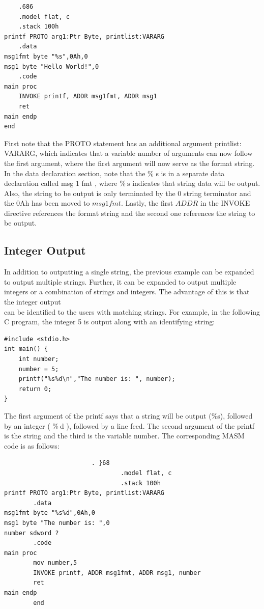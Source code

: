 \documentclass[10pt]{book}
\begin{document}
\begin{verbatim}
    .686
    .model flat, c
    .stack 100h
printf PROTO arg1:Ptr Byte, printlist:VARARG
    .data
msg1fmt byte "%s",0Ah,0
msg1 byte "Hello World!",0
    .code
main proc
    INVOKE printf, ADDR msg1fmt, ADDR msg1
    ret
main endp
end
\end{verbatim}

First note that the PROTO statement has an additional argument printlist: VARARG, which indicates that a variable number of arguments can now follow the first argument, where the first argument will now serve as the format string. In the data declaration section, note that the $\%$ s is in a separate data declaration called msg 1 fmt , where $\% \mathrm{~s}$ indicates that string data will be output. Also, the string to be output is only terminated by the 0 string terminator and the 0Ah has been moved to $m s g 1 f m t$. Lastly, the first $A D D R$ in the INVOKE directive references the format string and the second one references the string to be output.

\subsection{Integer Output}
In addition to outputting a single string, the previous example can be expanded to output multiple strings. Further, it can be expanded to output multiple integers or a combination of strings and integers. The advantage of this is that the integer output\\
can be identified to the users with matching strings. For example, in the following C program, the integer 5 is output along with an identifying string:


\begin{verbatim}
#include <stdio.h>
int main() {
    int number;
    number = 5;
    printf("%s%d\n","The number is: ", number);
    return 0;
}
\end{verbatim}

The first argument of the printf says that a string will be output (\%s), followed by an integer ( $\% \mathrm{~d}$ ), followed by a line feed. The second argument of the printf is the string and the third is the variable number. The corresponding MASM code is as follows:

\begin{verbatim}
                        . }68
                                .model flat, c
                                .stack 100h
printf PROTO arg1:Ptr Byte, printlist:VARARG
        .data
msg1fmt byte "%s%d",0Ah,0
msg1 byte "The number is: ",0
number sdword ?
        .code
main proc
        mov number,5
        INVOKE printf, ADDR msg1fmt, ADDR msg1, number
        ret
main endp
        end
\end{verbatim}
\end{document}
